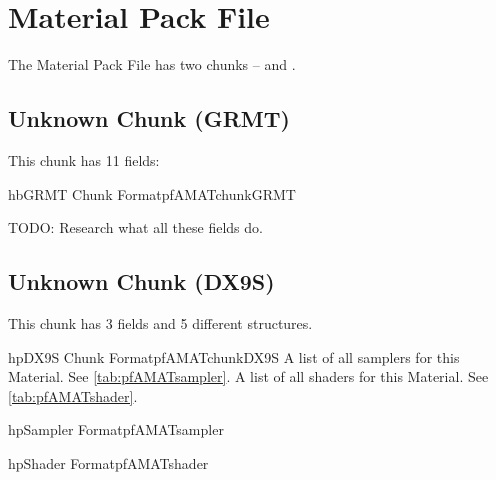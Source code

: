\section{Material Pack File}
\label{sec:pfAMAT}

The Material Pack File has two chunks --  and
.

\subsection{Unknown Chunk (GRMT)}
\label{subsec:pfAMATchunkGRMT}

This chunk has 11 fields:

\begin{datastructure}{hb}{GRMT Chunk Format}{pfAMATchunkGRMT}
\end{datastructure}

TODO: Research what all these fields do.

\subsection{Unknown Chunk (DX9S)}
\label{subsec:pfAMATchunkDX9S}

This chunk has 3 fields and 5 different structures.

\begin{datastructure}{hp}{DX9S Chunk Format}{pfAMATchunkDX9S}
	      {A list of all samplers for this Material.%
	       See \autoref{tab:pfAMATsampler}.}
	      {A list of all shaders for this Material.%
	       See \autoref{tab:pfAMATshader}.}
\end{datastructure}

\begin{datastructure}{hp}{Sampler Format}{pfAMATsampler}
\end{datastructure}

\begin{datastructure}{hp}{Shader Format}{pfAMATshader}
\end{datastructure}


